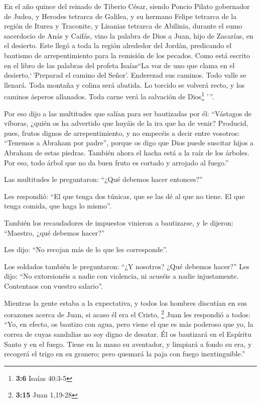 \begin{paracol}{2}
 En el año quince del reinado de Tiberio César, siendo
Poncio Pilato gobernador de Judea, y Herodes tetrarca de Galilea, y su
hermano Felipe tetrarca de la región de Iturea y Traconite, y Lisanias
tetrarca de Abilinia,  durante el sumo sacerdocio de Anás
y Caifás, vino la palabra de Dios a Juan, hijo de Zacarías, en el
desierto.  Este llegó a toda la región alrededor del
Jordán, predicando el bautismo de arrepentimiento para la remisión de
los pecados.  Como está escrito en el libro de las
palabras del profeta Isaías``La voz de uno que clama en el
desierto,`\,'Preparad el camino del Señor'. Enderezad sus caminos.
 Todo valle se llenará. Toda montaña y colina será
abatida. Lo torcido se volverá recto, y los caminos ásperos allanados.
 Toda carne verá la salvación de Dios\footnote{\textbf{3:6}
  Isaías 40:3-5} '\,''.

 Por eso dijo a las multitudes que salían para ser
bautizadas por él: ``Vástagos de víboras, ¿quién os ha advertido que
huyáis de la ira que ha de venir?  Producid, pues, frutos
dignos de arrepentimiento, y no empecéis a decir entre vosotros:
``Tenemos a Abraham por padre'', porque os digo que Dios puede suscitar
hijos a Abraham de estas piedras.  También ahora el hacha
está a la raíz de los árboles. Por eso, todo árbol que no da buen fruto
es cortado y arrojado al fuego.''

 Las multitudes le preguntaron: ``¿Qué debemos hacer
entonces?''

 Les respondió: ``El que tenga dos túnicas, que se las dé
al que no tiene. El que tenga comida, que haga lo mismo''.

 También los recaudadores de impuestos vinieron a
bautizarse, y le dijeron: ``Maestro, ¿qué debemos hacer?''

 Les dijo: ``No recojan más de lo que les corresponde''.

 Los soldados también le preguntaron: ``¿Y nosotros? ¿Qué
debemos hacer?'' Les dijo: ``No extorsionéis a nadie con violencia, ni
acuséis a nadie injustamente. Contentaos con vuestro salario''.

 Mientras la gente estaba a la expectativa, y todos los
hombres discutían en sus corazones acerca de Juan, si acaso él era el
Cristo, \footnote{\textbf{3:15} Juan 1,19-28}  Juan les
respondió a todos: ``Yo, en efecto, os bautizo con agua, pero viene el
que es más poderoso que yo, la correa de cuyas sandalias no soy digno de
desatar. Él os bautizará en el Espíritu Santo y en el fuego.
 Tiene en la mano su aventador, y limpiará a fondo su
era, y recogerá el trigo en su granero; pero quemará la paja con fuego
inextinguible.''


\end{paracol}

